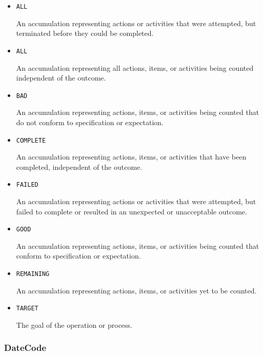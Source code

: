 \begin{itemize}

\item \texttt{ALL}


An accumulation representing actions or activities that were attempted, but terminated before they could be completed.

\item \texttt{ALL}


An accumulation representing all actions, items, or activities being counted independent of the outcome.

\item \texttt{BAD}


An accumulation representing actions, items, or activities being counted that do not conform to specification or expectation.

\item \texttt{COMPLETE}


An accumulation representing actions, items, or activities that have been completed, independent of the outcome.

\item \texttt{FAILED}


An accumulation representing actions or activities that were attempted, but failed to
complete or resulted in an unexpected or unacceptable outcome.

\item \texttt{GOOD}


An accumulation representing actions, items, or activities being counted that conform to specification or expectation.

\item \texttt{REMAINING}


An accumulation representing actions, items, or activities yet to be counted.

\item \texttt{TARGET}


The goal of the operation or process.


\end{itemize}











\subsubsection{DateCode}
\label{sec:DateCode}




